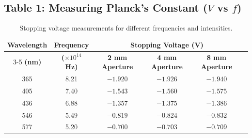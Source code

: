 \documentclass[12pt, a4paper]{article}
\begin{document}
\subsection*{Table 1: Measuring Planck's Constant ($V$ vs $f$)}
\begin{table}[H]
    \centering
    \begin{tabular}{cccccc}
        \toprule
        \textbf{Wavelength} & \textbf{Frequency} & \multicolumn{3}{c}{\textbf{Stopping Voltage (V)}} \\
        \cmidrule(lr){3-5}
        \textbf{(nm)} & \textbf{($\times 10^{14}$ Hz)} & \textbf{2 mm Aperture} & \textbf{4 mm Aperture} & \textbf{8 mm Aperture} \\
        \midrule
        365 & 8.21 & $-1.920$ & $-1.926$ & $-1.940$ \\
        405 & 7.40 & $-1.543$ & $-1.560$ & $-1.575$ \\
        436 & 6.88 & $-1.357$ & $-1.375$ & $-1.386$ \\
        546 & 5.49 & $-0.819$ & $-0.824$ & $-0.832$ \\
        577 & 5.20 & $-0.700$ & $-0.703$ & $-0.709$ \\
        \bottomrule
    \end{tabular}
    \caption{Stopping voltage measurements for different frequencies and intensities.}
\end{table}
\end{document}
